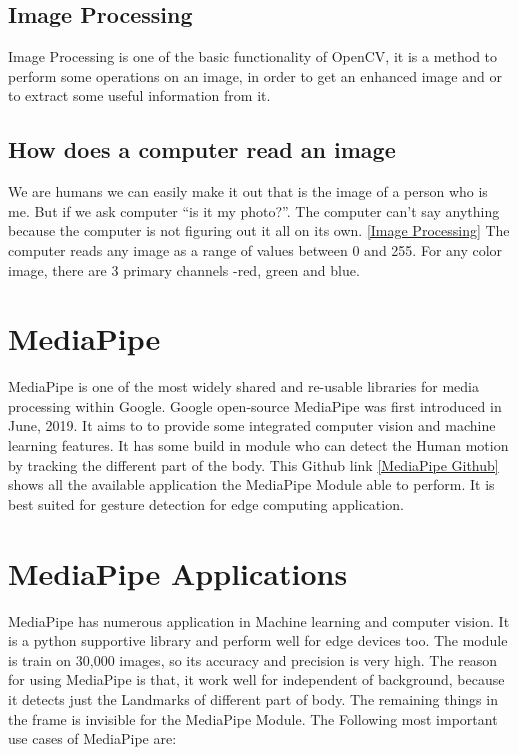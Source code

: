 \subsection{Image Processing}
Image Processing is one of the basic functionality of OpenCV, it is a method to perform some operations on an image, in order to get an enhanced image and or to extract some useful information from it. 

\subsection{How does a computer read an image}

We are humans we can easily make it out that is the image of a person who is me. But if we ask computer “is it my photo?”. The computer can’t say anything because the computer is not figuring out it all on its own. \href{https://www.geeksforgeeks.org/opencv-overview/}{[Image Processing]}
The computer reads any image as a range of values between 0 and 255. For any color image, there are 3 primary channels -red, green and blue.

\section{MediaPipe}

MediaPipe is one of the most widely shared and re-usable libraries for media processing within Google. Google open-source MediaPipe was first introduced in June, 2019. It aims to to provide some integrated computer vision and machine learning features. It has some build in module who can detect the Human motion by tracking the different part of the body. This Github link \href{https://github.com/google/mediapipe}{[MediaPipe Github]} shows all the available application the MediaPipe Module able to perform. It is best suited for gesture detection for edge computing application.

\section{MediaPipe Applications}

MediaPipe has numerous application in Machine learning and computer vision. It is a python supportive library and perform well for edge devices too. The module is train on 30,000 images, so its accuracy and precision is very high. The reason for using MediaPipe is that, it work well for independent of background, because it detects just the Landmarks of different part of body. The remaining things in the frame is invisible for the MediaPipe Module. The Following most important use cases of MediaPipe are:

